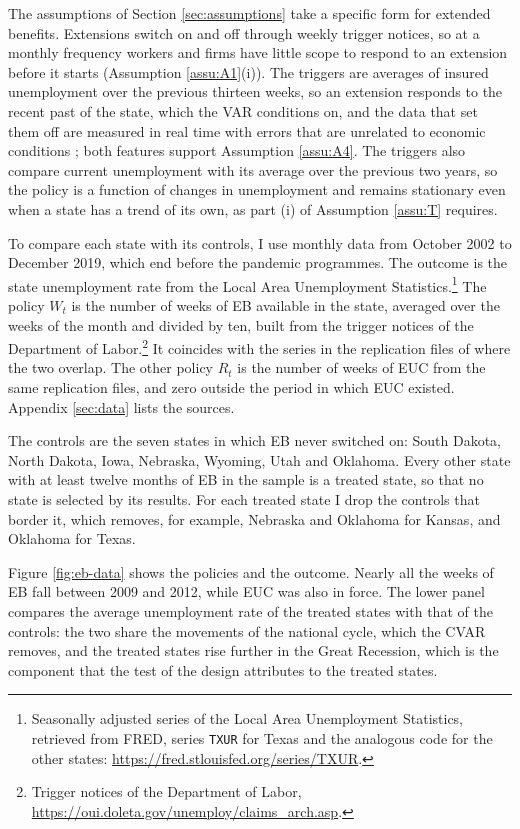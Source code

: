 \documentclass[12pt,a4paper]{article}
\theoremstyle{definition}
\begin{document}
The assumptions of Section \ref{sec:assumptions} take a specific form for extended benefits. Extensions switch on and off through weekly trigger notices, so at a monthly frequency workers and firms have little scope to respond to an extension before it starts (Assumption \ref{assu:A1}(i)). The triggers are averages of insured unemployment over the previous thirteen weeks, so an extension responds to the recent past of the state, which the VAR conditions on, and the data that set them off are measured in real time with errors that are unrelated to economic conditions \citep{ChodorowReichEtAl2019}; both features support Assumption \ref{assu:A4}. The triggers also compare current unemployment with its average over the previous two years, so the policy is a function of changes in unemployment and remains stationary even when a state has a trend of its own, as part (i) of Assumption \ref{assu:T} requires.

To compare each state with its controls, I use monthly data from October 2002 to December 2019, which end before the pandemic programmes. The outcome is the state unemployment rate from the Local Area Unemployment Statistics.\footnote{Seasonally adjusted series of the Local Area Unemployment Statistics, retrieved from FRED, series \texttt{TXUR} for Texas and the analogous code for the other states: \url{https://fred.stlouisfed.org/series/TXUR}.} The policy $W_t$ is the number of weeks of EB available in the state, averaged over the weeks of the month and divided by ten, built from the trigger notices of the Department of Labor.\footnote{Trigger notices of the Department of Labor, \url{https://oui.doleta.gov/unemploy/claims_arch.asp}.} It coincides with the series in the replication files of \citet{BooneEtAl2021} where the two overlap. The other policy $R_t$ is the number of weeks of EUC from the same replication files, and zero outside the period in which EUC existed. Appendix \ref{sec:data} lists the sources.

The controls are the seven states in which EB never switched on: South Dakota, North Dakota, Iowa, Nebraska, Wyoming, Utah and Oklahoma. Every other state with at least twelve months of EB in the sample is a treated state, so that no state is selected by its results. For each treated state I drop the controls that border it, which removes, for example, Nebraska and Oklahoma for Kansas, and Oklahoma for Texas.

Figure \ref{fig:eb-data} shows the policies and the outcome. Nearly all the weeks of EB fall between 2009 and 2012, while EUC was also in force. The lower panel compares the average unemployment rate of the treated states with that of the controls: the two share the movements of the national cycle, which the CVAR removes, and the treated states rise further in the Great Recession, which is the component that the test of the design attributes to the treated states.
\end{document}
